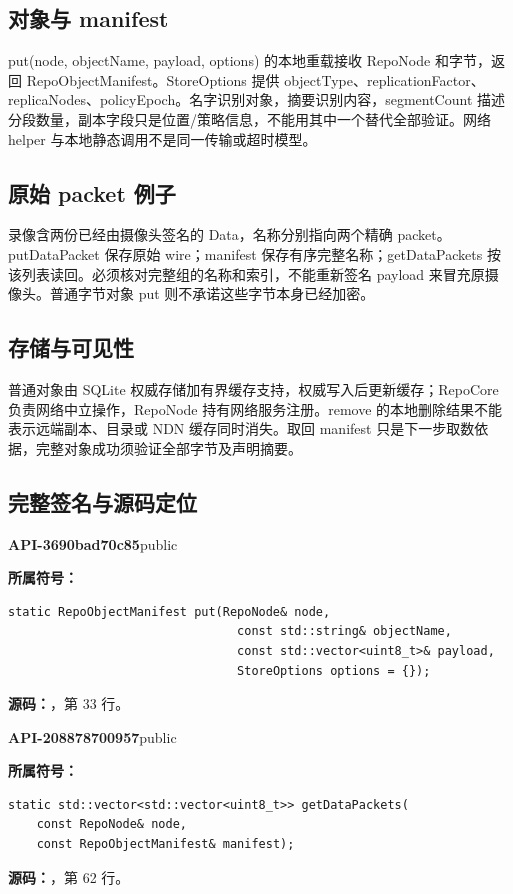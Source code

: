 \subsection{对象与 manifest}
put(node, objectName, payload, options) 的本地重载接收 RepoNode 和字节，返回 RepoObjectManifest。StoreOptions 提供 objectType、replicationFactor、replicaNodes、policyEpoch。名字识别对象，摘要识别内容，segmentCount 描述分段数量，副本字段只是位置/策略信息，不能用其中一个替代全部验证。网络 helper 与本地静态调用不是同一传输或超时模型。

\subsection{原始 packet 例子}
录像含两份已经由摄像头签名的 Data，名称分别指向两个精确 packet。putDataPacket 保存原始 wire；manifest 保存有序完整名称；getDataPackets 按该列表读回。必须核对完整组的名称和索引，不能重新签名 payload 来冒充原摄像头。普通字节对象 put 则不承诺这些字节本身已经加密。

\subsection{存储与可见性}
普通对象由 SQLite 权威存储加有界缓存支持，权威写入后更新缓存；RepoCore 负责网络中立操作，RepoNode 持有网络服务注册。remove 的本地删除结果不能表示远端副本、目录或 NDN 缓存同时消失。取回 manifest 只是下一步取数依据，完整对象成功须验证全部字节及声明摘要。

\subsection{完整签名与源码定位}

\textbf{API-3690bad70c85}\quad public\par
\textbf{所属符号：}\par
\begin{Verbatim}[fontsize=\footnotesize,breaklines,breakanywhere]
static RepoObjectManifest put(RepoNode& node,
                                const std::string& objectName,
                                const std::vector<uint8_t>& payload,
                                StoreOptions options = {});
\end{Verbatim}
\textbf{源码：}，第 33 行。\par

\textbf{API-208878700957}\quad public\par
\textbf{所属符号：}\par
\begin{Verbatim}[fontsize=\footnotesize,breaklines,breakanywhere]
static std::vector<std::vector<uint8_t>> getDataPackets(
    const RepoNode& node,
    const RepoObjectManifest& manifest);
\end{Verbatim}
\textbf{源码：}，第 62 行。\par

